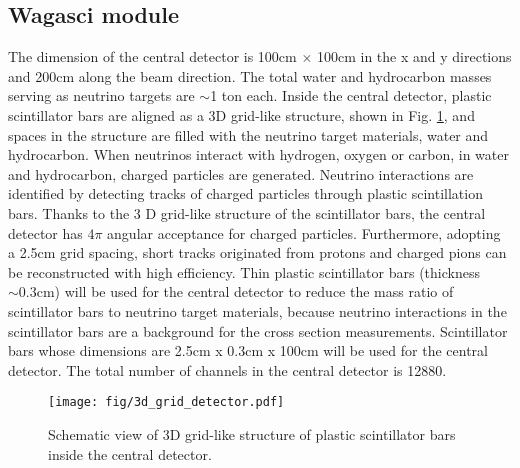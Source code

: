 \subsection{Wagasci module}
The dimension of the central detector is 100cm $\times$ 100cm in the x and y directions
and 200cm along the beam direction.
The total water and hydrocarbon masses serving as neutrino targets are $\sim$1 ton each.
Inside the central detector, plastic scintillator bars are aligned as a 3D grid-like structure, shown in Fig. \ref{fig:3dgrid},
and spaces in the structure are filled with the neutrino target materials, water and hydrocarbon.
When neutrinos interact with hydrogen, oxygen or carbon, in water and hydrocarbon,
charged particles are generated.
Neutrino interactions are identified by detecting tracks of charged particles through plastic scintillation bars.
Thanks to the 3 D grid-like structure of the scintillator bars, 
the central detector has $4\pi$ angular acceptance for charged particles.
Furthermore, adopting a 2.5cm grid spacing, short tracks originated from protons and charged pions can be reconstructed
with high efficiency.
Thin plastic scintillator bars (thickness $\sim 0.3$cm) will be used for the central detector
to reduce  the mass ratio of scintillator bars to neutrino target materials,
because neutrino interactions in the scintillator bars are a background for the cross section measurements.
Scintillator bars whose dimensions are 2.5cm x 0.3cm x 100cm will be used for the central detector.
The total number of channels in the central detector is 12880.

\begin{figure}[tbh]
\begin{center}
\texttt{[image: fig/3d\_grid\_detector.pdf]}
\end{center}
\caption{
Schematic view of 3D grid-like structure of plastic scintillator bars inside the central detector.
}
\label{fig:3dgrid}
\end{figure}
